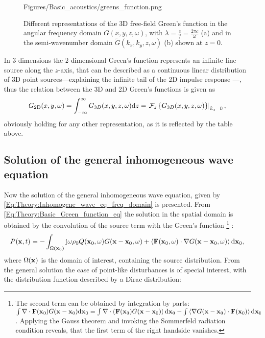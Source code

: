 \begin{figure}
	\centering
	\begin{overpic}[width = .95\columnwidth]{Figures/Basic_acoustics/greens_function.png}
	\small
	\end{overpic}
	\caption{Different representations of the 3D free-field Green's function in the angular frequency domain $G(x,y,z,\omega)$, with $\lambda = \frac{c}{f} = \frac{2\pi c}{\omega}$ (a) and in the semi-wavenumber domain $\tilde{G}(k_x,k_y,z,\omega)$ (b) shown at $z=0$.}
	\label{Fig:Theory:Greens_function}
\end{figure}
%
In 3-dimensions the 2-dimensional Green's function represents an infinite line source along the $z$-axis, that can be described as a continuous linear distribution of 3D point sources---explaining the infinite tail of the 2D impulse response%
---, thus the relation between the 3D and 2D Green's functions is given as
\begin{equation}
G_{2\mathrm{D}}(x,y,\omega) = \int_{-\infty}^{\infty} G_{3D}(x,y,z,\omega) \mathrm{d} z = \left. \mathcal{F}_{z}\left\{ G_{3D}(x,y,z,\omega) \right\}\right|_{k_z = 0},
\label{Eq:Wave_Theory:2D_Green}
\end{equation} 
obviously holding for any other representation, as it is reflected by the table above.

\subsection{Solution of the general inhomogeneous wave equation} 
Now the solution of the general inhomogeneous wave equation, given by \eqref{Eq:Theory:Inhomogene_wave_eq_freq_domain} is presented.
From \eqref{Eq:Theory:Basic_Green_function_eq} the solution in the spatial domain is obtained by the convolution of the source term with the Green's function 
\footnote{The second term can be obtained by integration by parts: $
\int \nabla \cdot \mathbf{F}(\mathbf{x}_0)G(\mathbf{x}-\mathbf{x}_0) \mathrm{d} \mathbf{x}_0 = 
\int \nabla \cdot \left( \mathbf{F}(\mathbf{x}_0)G(\mathbf{x}-\mathbf{x}_0) \right) \mathrm{d} \mathbf{x}_0 
- \int \left< \nabla G(\mathbf{x}-\mathbf{x}_0)  \cdot \mathbf{F}(\mathbf{x}_0) \right> \mathrm{d} \mathbf{x}_0 $.
Applying the Gauss theorem and invoking the Sommerfeld radiation condition reveals, that the first term of the right handside vanishes.}
:
\begin{equation}
P(\mathbf{x},t) = -\int_{\Omega(\mathbf{x}_0)} \mathrm{j} \omega \rho_0 Q(\mathbf{x}_0,\omega)G(\mathbf{x}-\mathbf{x}_0,\omega) +  \left< \mathbf{F}(\mathbf{x}_0,\omega)\cdot \nabla G(\mathbf{x}-\mathbf{x}_0,\omega) \right> \mathrm{d} \mathbf{x}_0,
\end{equation}	
where $\Omega(\mathbf{x})$ is the domain of interest, containing the source distribution.
From the general solution the case of point-like disturbances is of special interest, with the distribution function described by a Dirac distribution:
%

